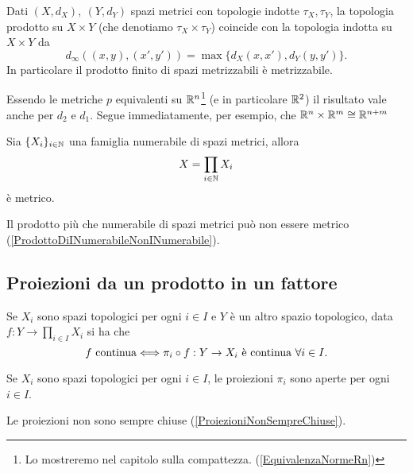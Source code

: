 \begin{multicols*}{2}
\begin{proposition}
Dati $(X,d_X),\ (Y,d_Y)$ spazi metrici con topologie indotte $\tau_X,\tau_Y$, la topologia prodotto su $X\times Y$ (che denotiamo $\tau_X\times \tau_Y$) coincide con la topologia indotta su $X\times Y$ da
\[d_\infty((x,y),(x',y'))=\max\{d_X(x,x'),d_Y(y,y')\}.\]
In particolare il prodotto finito di spazi metrizzabili è metrizzabile.
\end{proposition}
\begin{remark}
Essendo le metriche $p$ equivalenti su $\mathbb{R}^n$\footnote{Lo mostreremo nel capitolo sulla compattezza. (\ref{EquivalenzaNormeRn})} (e in particolare $\mathbb{R}^2$) il risultato vale anche per $d_2$ e $d_1$. Segue immediatamente, per esempio, che $\mathbb{R}^n\times \mathbb{R}^m\cong \mathbb{R}^{n+m}$
\end{remark}

\begin{proposition}\label{ProdottoNumerabileDiMetriciEMetrico}
Sia $\{X_i\}_{i\in \mathbb{N}}$ una famiglia numerabile di spazi metrici, allora
\[X=\prod_{i\in\mathbb{N}}X_i\]
è metrico.
\end{proposition}



\begin{remark}
Il prodotto più che numerabile di spazi metrici può non essere metrico (\ref{ProdottoDiINumerabileNonINumerabile}).
\end{remark}

\subsection{Proiezioni da un prodotto in un fattore}

\begin{theorem}
Se $X_i$ sono spazi topologici per ogni $i\in I$ e $Y$ è un altro spazio topologico, data $f:Y\to \prod_{i\in I}X_i$ si ha che
\[f\ \text{continua}\Longleftrightarrow \pi_i\circ f:Y\to X_i\text{ è continua }\forall i\in I.\]
\end{theorem}

\begin{theorem}\label{ProiezioniSonoAperte}
Se $X_i$ sono spazi topologici per ogni $i\in I$, le proiezioni $\pi_i$ sono aperte per ogni $i\in I$.
\end{theorem}
\begin{remark}
Le proiezioni non sono sempre chiuse (\ref{ProiezioniNonSempreChiuse}).
\end{remark}


\end{multicols*}
